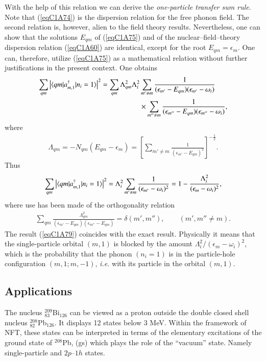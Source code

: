 With the help of this relation we can derive the\textit{ one-particle transfer sum rule}. Note that (\ref{eqC1A74}) is the dispersion relation for the free phonon field. The second relation is, however, alien to the field theory results. Nevertheless, one can show that the solutions $E_{qm}$ of (\ref{eqC1A75}) and of the nuclear--field--theory dispersion relation (\ref{eqC1A60}) are identical, except for the root $E_{qm}=\epsilon_m$. One can, therefore, utilize (\ref{eqC1A75}) as a mathematical relation without further justifications in the 
present context. One obtains 
  \begin{align}\label{eqC1A77} 
   \nonumber \sum_{qm}\left|\langle {qm|a^\dagger_{m,1}|n_i=1} \rangle\right|^2=\sum_{qm}\Lambda_{qm}^2\Lambda_i^2& \sum_{m'\neq m}\frac{1}{(\epsilon_{m'}-E_{qm})(\epsilon_{m'}-\omega_i)}\\
   &\times \sum_{m''\neq m}\frac{1}{(\epsilon_{m''}-E_{qm})(\epsilon_{m''}-\omega_i)},
    \end{align} 
where
  \begin{align}\label{eqC1A78} 
   \Lambda_{qm}=-N_{qm}(E_{qm}-\epsilon_m)=\left[\sum_{m'\neq m}\frac{1}{\left(\epsilon_{m'}-E_{qm}\right)^2}\right]^{-\frac{1}{2}}.
    \end{align} 
    Thus
      \begin{align}\label{eqC1A79} 
 \sum_{qm}\left|\langle {qm|a^\dagger_{m,1}|n_i=1} \rangle\right|^2=\Lambda_i^2\sum_{m'\neq m}\frac{1}{(\epsilon_{m'}-\omega_i)^2}=1-\frac{\Lambda^2_i}{(\epsilon_m-\omega_i)^2},     
        \end{align} 
where use has been made of the orthogonality relation 
  \begin{align}\label{eqC1A80} 
\sum_{qm}\frac{\Lambda_{qm}^2}{(\epsilon_{m'}-E_{qm})(\epsilon_{m''}-E_{qm})}=\delta(m',m''),\qquad (m',m''\neq m).
    \end{align}  
The result (\ref{eqC1A79}) coincides with the exact result. Physically it means that the single-particle orbital $(m, 1)$ is blocked by the amount $\Lambda_i^2/(\epsilon_m-\omega_i)^2$, which is the probability that the phonon $(n_i= 1)$ is in the particle-hole configuration $(m,1;m,-1)$, \textit{i.e.} with its particle in the orbital $(m,1)$. 
\subsection{Applications}\label{Sect1.7.4}
The nucleus $^{209}_{83}$Bi$_{126}$ can be viewed as a proton outside the double closed shell nucleus $^{208}_{82}$Pb$_{126}$. It displays 12 states below 3 MeV. Within the framework of NFT, these states can be interpreted in terms of the elementary excitations of the ground state  of $^{208}$Pb, (gs) which plays the role of the ``vacuum'' state. Namely single-particle and $2p$--$1h$ states. 


